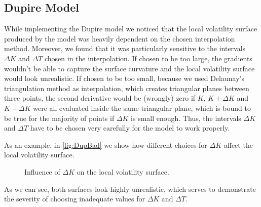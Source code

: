 \subsection{Dupire Model}
While implementing the Dupire model we noticed that the local volatility surface produced by the model was heavily dependent on the chosen interpolation method. Moreover, we found that it was particularly sensitive to the intervals $\Delta K$ and $\Delta T$ chosen in the interpolation. If chosen to be too large, the gradients wouldn't be able to capture the surface curvature and the local volatility surface would look unrealistic. If chosen to be too small, because we used Delaunay's triangulation method as interpolation, which creates triangular planes between three points, the second derivative would be (wrongly) zero if $K$, $K+\Delta K$ and $K-\Delta K$ were all evaluated inside the same triangular plane, which is bound to be true for the majority of points if $\Delta K$ is small enough.
Thus, the intervals $\Delta K$ and $\Delta T$ have to be chosen very carefully for the model to work properly.

\vfill
\newpage

As an example, in \autoref{fig:DupBad} we show how different choices for $\Delta K$ affect the local volatility surface.



\begin{figure}[H]
  \begin{subfigmatrix}{2}
  \end{subfigmatrix}
    \caption[Influence of $\Delta K$ on the local volatility surface.]{Influence of $\Delta K$ on the local volatility surface.}\label{fig:DupBad}
\end{figure} 
 
  
As we can see, both surfaces look highly unrealistic, which serves to demonstrate the severity of choosing inadequate values for $\Delta K$ and $\Delta T$.

